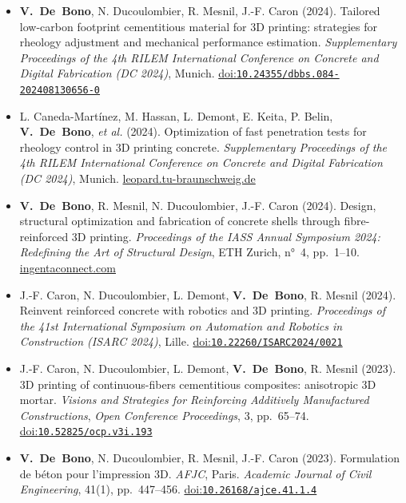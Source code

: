 \documentclass[11pt,a4paper]{article}
\newcommand{\doi}[1]{\href{https://doi.org/#1}{doi:\nolinkurl{#1}}}
\newcommand{\me}{\textbf{V.~De~Bono}}
\newenvironment{publis}[1]%
  {\begin{itemize}[label={}, leftmargin=1.2em, labelwidth=0pt, labelsep=0pt,
     itemindent=-1.2em, itemsep=0.45em, topsep=0.3em]}%
  {\end{itemize}}
\begin{document}
\begin{publis}{C}
  \item \me, N. Ducoulombier, R. Mesnil, J.-F. Caron (2024).
  Tailored low-carbon footprint cementitious material for 3D printing: strategies for rheology adjustment and mechanical performance estimation.
  \emph{Supplementary Proceedings of the 4th RILEM International Conference on Concrete and Digital Fabrication (DC 2024)}, Munich.
  \doi{10.24355/dbbs.084-202408130656-0}

  \item L. Caneda-Martínez, M. Hassan, L. Demont, E. Keita, P. Belin, \me, \emph{et al.} (2024).
  Optimization of fast penetration tests for rheology control in 3D printing concrete.
  \emph{Supplementary Proceedings of the 4th RILEM International Conference on Concrete and Digital Fabrication (DC 2024)}, Munich.
  \href{https://leopard.tu-braunschweig.de/receive/dbbs_mods_00077815}{leopard.tu-braunschweig.de}

  \item \me, R. Mesnil, N. Ducoulombier, J.-F. Caron (2024).
  Design, structural optimization and fabrication of concrete shells through fibre-reinforced 3D printing.
  \emph{Proceedings of the IASS Annual Symposium 2024: Redefining the Art of Structural Design}, ETH Zurich, n°~4, pp.~1--10.
  \href{https://www.ingentaconnect.com/contentone/iass/piass/2024/00002024/00000004/art00009}{ingentaconnect.com}

  \item J.-F. Caron, N. Ducoulombier, L. Demont, \me, R. Mesnil (2024).
  Reinvent reinforced concrete with robotics and 3D printing.
  \emph{Proceedings of the 41st International Symposium on Automation and Robotics in Construction (ISARC 2024)}, Lille.
  \doi{10.22260/ISARC2024/0021}

  \item J.-F. Caron, N. Ducoulombier, L. Demont, \me, R. Mesnil (2023).
  3D printing of continuous-fibers cementitious composites: anisotropic 3D mortar.
  \emph{Visions and Strategies for Reinforcing Additively Manufactured Constructions}, \emph{Open Conference Proceedings}, 3, pp.~65--74.
  \doi{10.52825/ocp.v3i.193}

  \item \me, N. Ducoulombier, R. Mesnil, J.-F. Caron (2023).
  Formulation de béton pour l'impression 3D.
  \emph{AFJC}, Paris. \emph{Academic Journal of Civil Engineering}, 41(1), pp.~447--456.
  \doi{10.26168/ajce.41.1.4}
\end{publis}

\end{document}
